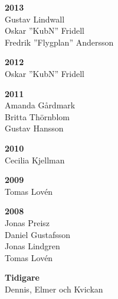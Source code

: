 {\begin{multicols}{2}
\textbf{2013}\\
Gustav Lindwall\\
Oskar ''KubN'' Fridell\\
Fredrik ''Flygplan'' Andersson

\textbf{2012}\\
Oskar ''KubN'' Fridell

\textbf{2011}\\
Amanda Gårdmark\\
Britta Thörnblom\\
Gustav Hansson

\textbf{2010}\\
Cecilia Kjellman

\textbf{2009}\\
Tomas Lovén

\textbf{2008}\\
Jonas Preisz\\
Daniel Gustafsson\\
Jonas Lindgren\\
Tomas Lovén

\textbf{Tidigare}\\
Dennis, Elmer och Kvickan
\end{multicols}
}
